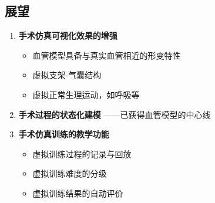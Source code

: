\subsection{展望}
\begin{frame}
\begin{enumerate}
\item \textbf{手术仿真可视化效果的增强}
\begin{itemize}
\item 血管模型具备与真实血管相近的形变特性
\item 虚拟支架-气囊结构
\item 虚拟正常生理运动，如呼吸等
\end{itemize}
\pause \item \textbf{手术过程的状态化建模} \pause ——已获得血管模型的中心线
\pause \item \textbf{手术仿真训练的教学功能}
\begin{itemize}
\item 虚拟训练过程的记录与回放
\item 虚拟训练难度的分级
\item 虚拟训练结果的自动评价
\end{itemize}
\end{enumerate}
\end{frame}




